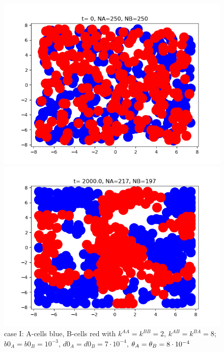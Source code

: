 




\begin{figure}[htb]
	\begin{minipage}[t]{.45\textwidth}
		\centering
		\includegraphics[width=\textwidth]{micro_ini_caseI1}
	\end{minipage}
	\hfill
	\begin{minipage}[t]{.45\textwidth}
		\centering
		\includegraphics[width=\textwidth]{micro_fin_caseI1}
	\end{minipage}  
	\caption{{case I: A-cells blue, B-cells red with $k^{AA}=k^{BB}=2 $, $k^{AB}=k^{BA}=8$; $b0_A=b0_B=10^{-3}$, $d0_A=d0_B=7\cdot10^{-4}$}, ${\theta}_A={\theta}_B=8\cdot 10^{-4}$}
\end{figure}


